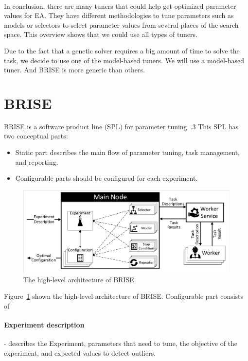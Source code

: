 \paragraph{}
In conclusion, there are many tuners that could help get optimized parameter values for EA. They have different methodologies to tune parameters such as models or selectors to select parameter values from several places of the search space. This overview shows that we could use all types of tuners. 

Due to the fact that a genetic solver requires a big amount of time to solve the task, we decide to use one of the model-based tuners. We will use a model-based tuner. And BRISE is more generic than others. 

\section{BRISE}\label{sec:BRISE}

BRISE is a software product line (SPL) for parameter tuning~\cite{pukhkaiev19}.3
This SPL has two conceptual parts:

\begin{itemize}
	\item Static part describes the main flow of parameter tuning, task management, and reporting.
	\item Configurable parts should be configured for each experiment.
\end{itemize}

\begin{figure}
	\centering
	\includegraphics[width=\textwidth]{images/BRISEarch.pdf}
	\caption[The high-level architecture of BRISE]{The high-level architecture of BRISE}
	\label{fig:BRISEarch}
\end{figure}

Figure~\ref{fig:BRISEarch} shown the high-level architecture of BRISE.
Configurable part consists of 
\paragraph{Experiment description} - describes the Experiment, parameters that need to tune, the objective of the experiment, and expected values to detect outliers.
